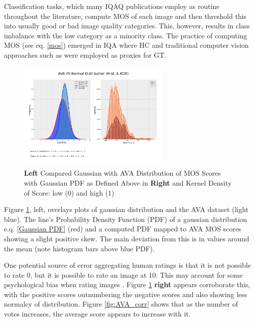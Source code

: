 Classification tasks, which many IQAQ publications employ as routine throughout the literature, compute MOS of each image and then threshold this into usually good or bad image quality categories. This, however, results in class imbalance with the low category as a minority class. The practice of computing MOS (see eq. \ref{mos}) emerged in IQA where HC and traditional computer vision approaches such as\cite{Wang2004} were employed as proxies for GT. 

\begin{figure}[ht!]
\specialrule{0.01em}{0.2em}{0.2em}
\centering
 \includegraphics[width=0.65\textwidth]{figures/data_plots/ava_paramiters_gt.png}
  \caption[width=0.5\textwidth]{\textbf{Left} Compared Gaussian with AVA Distribution of MOS Scores with Gaussian PDF as Defined Above in  \textbf{Right} and Kernel Density of Score: low (0) and high (1)}
  \label{fig:AVA_MOS}
\end{figure}


 Figure \ref{fig:AVA_MOS}, left, overlays plots of gaussian distribution and the AVA dataset (light blue). The line's Probability Density Function (PDF) of a gaussian distribution e.q. \ref{Gaussian PDF} (red) and a computed PDF mapped to AVA MOS scores showing a slight positive skew. The main deviation from this is in values around the mean (note histogram bars above blue PDF). 
 \par 
 
 One potential source of error aggregating human ratings is that it is not possible to rate 0, but it is possible to rate an image at 10. This may account for some psychological bias when rating images . Figure \ref{fig:AVA_MOS} \textbf{right}  appears corroborate this, with the positive scores outnumbering the negative scores and also showing less normalcy of distribution. Figure \ref{fig:AVA_corr} shows that as the number of votes increases, the average score appears to increase with it. 
 
